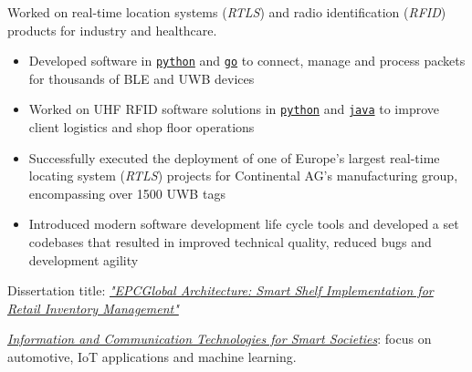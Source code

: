 \documentclass[10pt,a4paper,ragged2e,withhyper]{altacv}
\begin{document}
\begin{paracol}{2}
Worked on real-time location systems (\textit{RTLS}) and radio identification (\textit{RFID}) products for industry and healthcare.

\medskip

\begin{itemize}
  \item Developed software in \texttt{\href{https://www.python.org/}{python}} and \texttt{\href{https://go.dev/}{go}} to connect, manage and process packets for thousands of BLE and UWB devices
  \item Worked on UHF RFID software solutions in \texttt{\href{https://www.python.org/}{python}} and \texttt{\href{https://www.java.com/en/}{java}} to improve client logistics and shop floor operations
  \item Successfully executed the deployment of one of Europe's largest real-time locating system (\textit{RTLS}) projects for Continental AG's manufacturing group, encompassing over 1500 UWB tags
  \item Introduced modern software development life cycle tools and developed a set codebases that resulted in improved technical quality, reduced bugs and development agility
\end{itemize}

\switchcolumn


Dissertation title: \href{https://github.com/dvcorreia/epc-smart-shelve}{\textit{"EPCGlobal Architecture: Smart Shelf Implementation for Retail Inventory Management"}}

\divider

\href{https://www.polito.it/en/education/master-s-degree-programmes/ict-for-smart-societies}{\textit{Information and Communication Technologies for Smart Societies}}: focus on automotive, IoT applications and machine learning.






\end{paracol}
\end{document}

